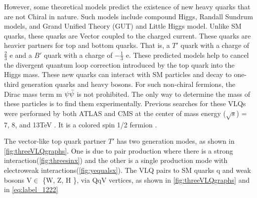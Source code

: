 However, some theoretical models predict the existence of new heavy quarks that are not Chiral
in nature. Such models include compound Higgs\cite{10.3389/fphy.2019.00022}, Randall Sundrum
models\cite{Randall_1999}, and Grand Unified Theory (GUT)\cite{Kang_2008} and Little Higgs
model\cite{Arkani_Hamed_2002}. Unlike SM quarks, these quarks are Vector coupled to the charged current. These quarks are heavier partners for top and bottom quarks\cite{Angelescu_2016}. That is, a $T'$ quark with a charge of $ \frac{2}{3} $ e and a $B'$ quark with a charge of $ -\frac{1}{3} $ e. These predicted models help to cancel the divergent quantum loop correction introduced by the top quark into the Higgs mass. These new quarks can interact with SM particles and  decay to one-third generation quarks and  heavy bosons. For such non-chiral fermions, the Dirac mass term m $ \psi\Bar{\psi} $ is not prohibited. The only way to determine the mass of these particles is to find them experimentally.  Previous searches for these VLQs were performed by both ATLAS and CMS at the center of mass energy ($ \sqrt{s}$) = 7, 8, and 13TeV \cite{Aad_2014}. It is a colored spin 1/2 fermion \cite{VLQ_1}. 
 
 
 







The vector-like top quark partner $T'$ has two generation modes, as shown in \autoref{fig:threeVLQgraphs}\cite{Belyaev_2021}. One is due to
pair production where  there is a strong interaction(\autoref{fig:threesinx}) and the other is a single production mode
with electroweak interactions(\autoref{fig:yequalsx}). The VLQ pairs to SM quarks q and weak bosons V$\in$ \{W, Z, H \},
via QqV vertices, as shown in \autoref{fig:threeVLQgraphs} and in \autoref{eq:label_1222}

